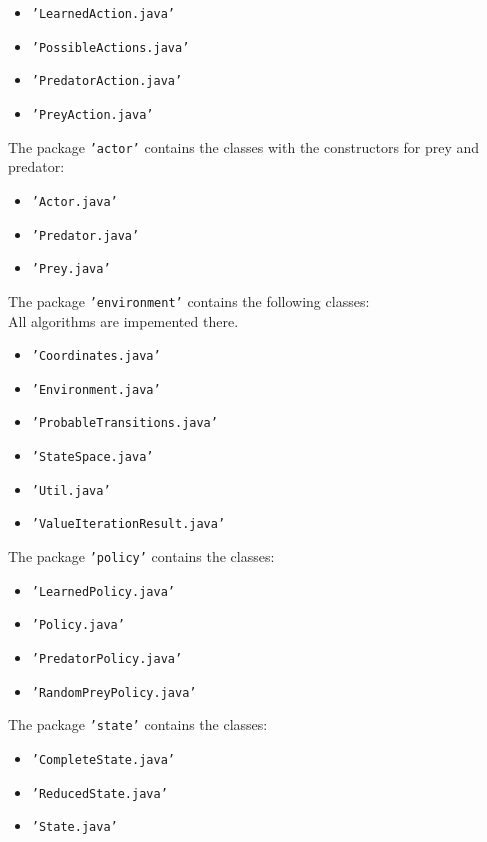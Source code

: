 \documentclass[11pt]{article}
\begin{document}
\begin{itemize}
	\item \texttt{'LearnedAction.java'}
	\item \texttt{'PossibleActions.java'}
	\item \texttt{'PredatorAction.java'}
	\item \texttt{'PreyAction.java'}
\end{itemize}

The package \texttt{'actor'} contains the classes with the constructors for prey and predator:

\begin{itemize}
	\item \texttt{'Actor.java'}
	\item \texttt{'Predator.java'}
	\item \texttt{'Prey.java'}
\end{itemize}

The package \texttt{'environment'} contains the following classes:\\
All algorithms are impemented there.

\begin{itemize}
	\item \texttt{'Coordinates.java'}
	\item \texttt{'Environment.java'}
	\item \texttt{'ProbableTransitions.java'}
	\item \texttt{'StateSpace.java'}
	\item \texttt{'Util.java'}
	\item \texttt{'ValueIterationResult.java'}
\end{itemize}

The package \texttt{'policy'} contains the classes:

\begin{itemize}
	\item \texttt{'LearnedPolicy.java'}
	\item \texttt{'Policy.java'}
	\item \texttt{'PredatorPolicy.java'}
	\item \texttt{'RandomPreyPolicy.java'}
\end{itemize}

The package \texttt{'state'} contains the classes:

\begin{itemize}
	\item \texttt{'CompleteState.java'}
	\item \texttt{'ReducedState.java'}
	\item \texttt{'State.java'}
\end{itemize}
\end{document}
